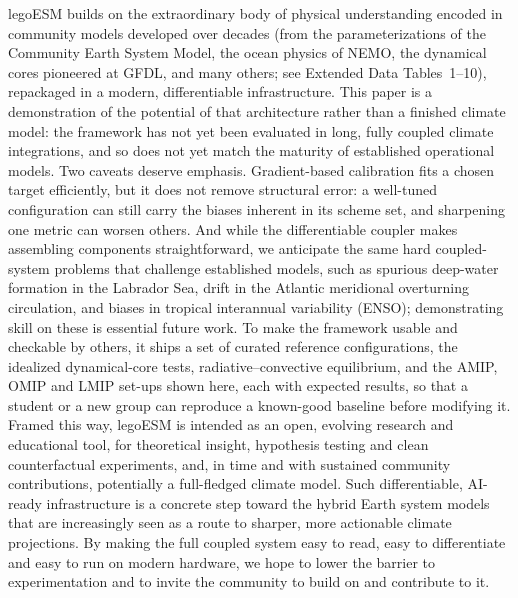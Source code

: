 \documentclass[11pt]{article}
\begin{document}
legoESM builds on the extraordinary body of physical understanding encoded in community models
developed over decades (from the parameterizations of the Community Earth System
Model\cite{Lawrence2019}, the ocean physics of NEMO\cite{Madec2017}, the dynamical cores
pioneered at GFDL, and many others; see Extended Data Tables~1--10), repackaged in a modern,
differentiable infrastructure. This paper is a demonstration of the potential of that
architecture rather than a finished climate model: the framework has not yet been evaluated in
long, fully coupled climate integrations, and so does not yet match the maturity of established
operational models. Two caveats deserve emphasis. Gradient-based calibration fits a chosen target
efficiently, but it does not remove structural error: a well-tuned configuration can still carry
the biases inherent in its scheme set, and sharpening one metric can worsen others. And while the
differentiable coupler makes assembling components straightforward, we anticipate the same hard
coupled-system problems that challenge established models, such as spurious deep-water formation
in the Labrador Sea, drift in the Atlantic meridional overturning circulation, and biases in
tropical interannual variability (ENSO); demonstrating skill on these is essential future work.
To make the framework usable and checkable by others, it ships a set of curated reference
configurations, the idealized dynamical-core tests, radiative--convective equilibrium, and the
AMIP, OMIP and LMIP set-ups shown here, each with expected results, so that a student or a new
group can reproduce a known-good baseline before modifying it. Framed this way, legoESM is
intended as an open, evolving research and educational tool, for theoretical insight, hypothesis
testing and clean counterfactual experiments, and, in time and with
sustained community contributions, potentially a full-fledged climate model. Such
differentiable, AI-ready infrastructure is a concrete step toward the hybrid Earth system models
that are increasingly seen as a route to sharper, more actionable climate
projections\cite{Eyring2024}. By making the full coupled system easy to read, easy to
differentiate and easy to run on modern hardware, we hope to lower the barrier to
experimentation and to invite the community to build on and contribute to it.
\end{document}
